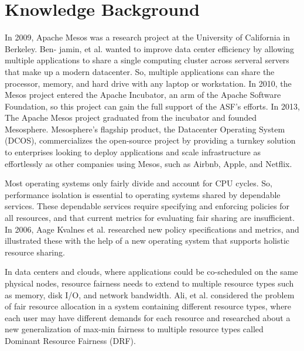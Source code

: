 \documentclass[12pt,oneside,openright,a4paper]{cpe-english-project}
\begin{document}
\section{Knowledge Background}

\hspace{10mm}In 2009, Apache Mesos \cite{mesos} was a research project at the University of California in Berkeley. Ben- jamin, et al. wanted to improve data center efficiency by allowing multiple applications to share a single computing cluster across serveral servers that make up a modern datacenter. So, multiple applications can share the processor, memory, and hard drive with any laptop or workstation. In 2010, the Mesos project entered the Apache Incubator, an arm of the Apache Software Foundation, so this project can gain the full support of the ASF’s efforts. In 2013, The Apache Mesos project graduated from the incubator and founded Mesosphere. Mesosphere’s flagship product, the Datacenter Operating System (DCOS), commercializes the  open-source project by providing a turnkey solution to enterprises looking to deploy applications and scale infrastructure as effortlessly as other companies using Mesos, such as Airbnb, Apple, and Netflix.

\hspace{10mm}Most operating systems only fairly divide and account for CPU cycles.  So, performance isolation is essential to operating systems shared by dependable services.  These dependable services require specifying and enforcing policies for all resources, and that current metrics for evaluating fair sharing are insufficient. In 2006, Aage Kvalnes et al. researched new policy specifications and metrics, and illustrated these with the help of a new operating system that supports holistic resource sharing.  \cite{policiesAndMetrics}

\hspace{10mm}In data centers and clouds, where applications could be co-scheduled on the same physical nodes, resource fairness needs to extend to multiple resource types such as memory, disk I/O, and network bandwidth.  Ali, et al. considered the problem of fair resource allocation in a system containing different resource types, where each user may have different demands for each resource and researched about a new generalization of max-min fairness to multiple resource types called Dominant Resource Fairness (DRF). \cite{dominantResourceFairness}

\end{document}
